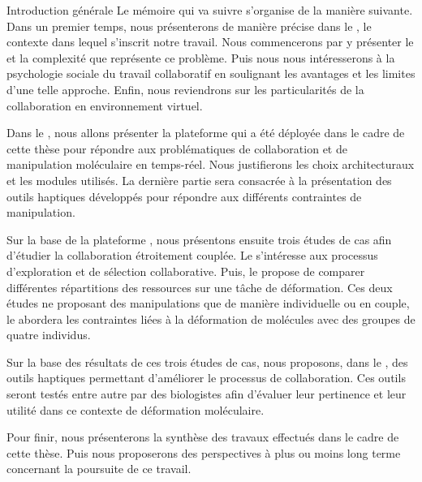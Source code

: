 \documentclass[myfrancais,ngerman,english,french]{mythesis}
\begin{document}
\begin{mychapter+}{Introduction générale}
		Le mémoire qui va suivre s'organise de la manière suivante.
		Dans un premier temps, nous présenterons de manière précise dans le , le contexte dans lequel s'inscrit notre travail.
		Nous commencerons par y présenter le  et la complexité que représente ce problème.
		Puis nous nous intéresserons à la psychologie sociale du travail collaboratif en soulignant les avantages et les limites d'une telle approche.
		Enfin, nous reviendrons sur les particularités de la collaboration en environnement virtuel.

		Dans le , nous allons présenter la plateforme \myShaddock qui a été déployée dans le cadre de cette thèse pour répondre aux problématiques de collaboration et de manipulation moléculaire en temps-réel.
		Nous justifierons les choix architecturaux et les modules utilisés.
		La dernière partie sera consacrée à la présentation des outils haptiques développés pour répondre aux différents contraintes de manipulation.

		Sur la base de la plateforme \myShaddock, nous présentons ensuite trois études de cas afin d'étudier la collaboration étroitement couplée.
		Le  s'intéresse aux processus d'exploration et de sélection collaborative.
		Puis, le  propose de comparer différentes répartitions des ressources sur une tâche de déformation.
		Ces deux études ne proposant des manipulations que de manière individuelle ou en couple, le  abordera les contraintes liées à la déformation de molécules avec des groupes de quatre individus.

		Sur la base des résultats de ces trois études de cas, nous proposons, dans le , des outils haptiques permettant d'améliorer le processus de collaboration.
		Ces outils seront testés entre autre par des biologistes afin d'évaluer leur pertinence et leur utilité dans ce contexte de déformation moléculaire.

		Pour finir, nous présenterons la synthèse des travaux effectués dans le cadre de cette thèse.
		Puis nous proposerons des perspectives à plus ou moins long terme concernant la poursuite de ce travail.
	\end{mychapter+}
\end{document}
